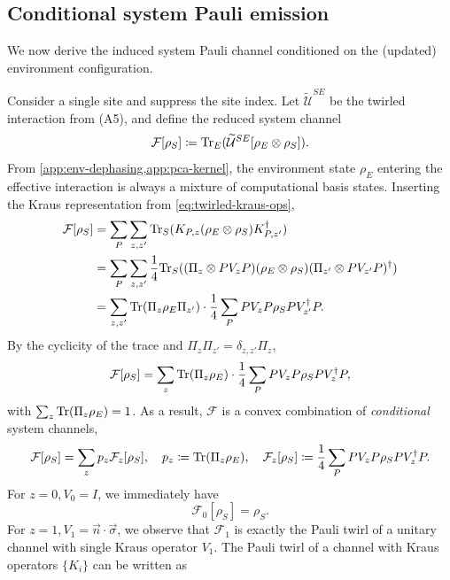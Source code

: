 \subsection{Conditional system Pauli emission}\label{app:system-pauli-emission}
We now derive the induced system Pauli channel conditioned on the (updated) environment configuration.

Consider a single site and suppress the site index. Let \(\widetilde{\mathcal{U}}^{SE}\) be the twirled interaction from (A5), and define the reduced system channel
\begin{equation}
    \mathcal{F}[\rho_S] \coloneq \mathrm{Tr}_E(\widetilde{\mathcal{U}}^{SE}[\rho_E \otimes \rho_S]).
\end{equation}
From \cref{app:env-dephasing,app:pca-kernel}, the environment state \(\rho_E\) entering the effective interaction is always a mixture of computational basis states. Inserting the Kraus representation from \cref{eq:twirled-kraus-ops},
\begin{equation}
    \begin{split}
        \mathcal{F}[\rho_S]
        &= \sum_P \sum_{z,z'} \mathrm{Tr}_S(K_{P,z} (\rho_E \otimes \rho_S) K_{P,z'}^\dagger) \\
        &= \sum_P \sum_{z,z'} \frac{1}{4} \mathrm{Tr}_S((\Pi_z \otimes PV_zP) (\rho_E \otimes \rho_S) (\Pi_{z'} \otimes PV_{z'}P)^\dagger) \\
        &= \sum_{z,z'} \mathrm{Tr}(\Pi_z \rho_E \Pi_{z'}) \cdot \frac{1}{4} \sum_P P V_z P \rho_S P V_{z'}^\dagger P.
    \end{split}
\end{equation}
By the cyclicity of the trace and \(\Pi_z\Pi_{z'} = \delta_{z,z'} \Pi_z\),
\begin{equation}
    \mathcal{F}[\rho_S] = \sum_z \mathrm{Tr}(\Pi_z \rho_E) \cdot \frac{1}{4} \sum_P P V_z P \rho_S P V_z^\dagger P,
\end{equation}
with \(\sum_z \mathrm{Tr}(\Pi_z \rho_E) = 1\). As a result, \(\mathcal{F}\) is a convex combination of \emph{conditional} system channels,
\begin{equation}
    \mathcal{F}[\rho_S] = \sum_z p_z \mathcal{F}_z[\rho_S], \quad p_z \coloneq \mathrm{Tr}(\Pi_z \rho_E), \quad \mathcal{F}_z[\rho_S] \coloneq \frac{1}{4} \sum_P P V_z P \rho_S P V_z^\dagger P.
\end{equation}
For \(z=0, V_0 = I\), we immediately have
\begin{equation}
    \mathcal{F}_0[\rho_S] = \rho_S.
\end{equation}
For \(z=1, V_1 = \vec{n} \cdot \vec{\sigma}\), we observe that \(\mathcal{F}_1\) is exactly the Pauli twirl of a unitary channel with single Kraus operator \(V_1\). The Pauli twirl of a channel with Kraus operators \(\{K_i\}\) can be written as
